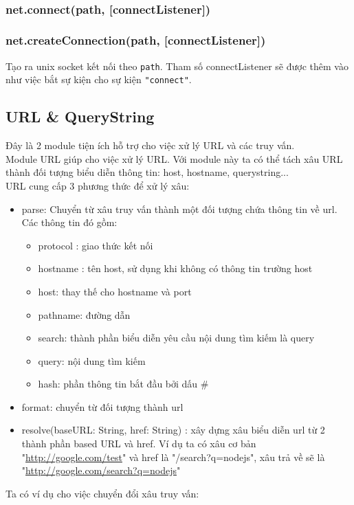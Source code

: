      \\
     \subsubsection{net.connect(path, [connectListener])}
     \subsubsection{net.createConnection(path, [connectListener])}
        Tạo ra unix socket kết nối theo \texttt{path}. Tham số connectListener sẽ được thêm vào như việc bắt sự kiện cho sự kiện \texttt{"connect"}.
\subsection{URL \& QueryString}
	Đây là 2 module tiện ích hỗ trợ cho việc xử lý URL và các truy vấn. \\
	Module URL giúp cho việc xử lý URL. Với module này ta có thể tách xâu URL thành đối tượng biểu diễn thông tin: host, hostname, querystring... \\
	URL cung cấp 3 phương thức để xử lý xâu:
		\begin{itemize}
			\item parse: Chuyển từ xâu truy vấn thành một đối tượng chứa thông tin về url. Các thông tin đó gồm:
			\begin{itemize}
				\item protocol : giao thức kết nối
				\item hostname : tên host, sử dụng khi không có thông tin trường host
				\item host: thay thế cho hostname và port
				\item pathname: đường dẫn
				\item search:  thành phần biểu diễn yêu cầu nội dung tìm kiếm là query
				\item query: nội dung tìm kiếm
				\item hash: phần thông tin bắt đầu bởi dấu \#
			\end{itemize}
			\item format: chuyển từ đối tượng thành url
			\item resolve(baseURL: String, href: String) : xây dựng xâu biểu diễn url từ 2 thành phần based URL và href. Ví dụ ta có xâu cơ bản "\url{http://google.com/test}" và href là "/search?q=nodejs", xâu trả về sẽ là "\url{http://google.com/search?q=nodejs}" 
		\end{itemize}
	Ta có ví dụ cho việc chuyển đổi xâu truy vấn:\\
	
